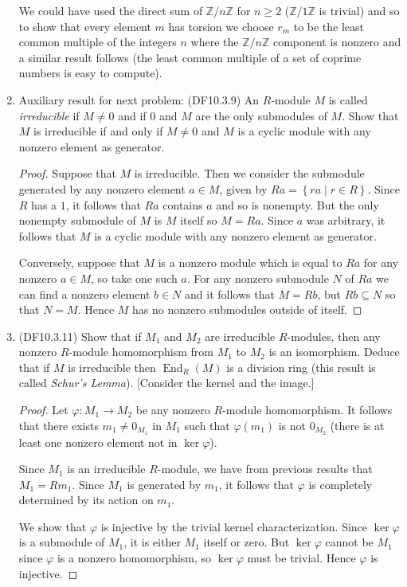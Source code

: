 \documentclass[11pt]{article}
\newcommand{\cbr}[1]{\left\{#1\right\}}
\DeclareMathOperator{\End}{End}
\begin{document}
\begin{enumerate}
    We could have used the direct sum of $\mathbb{Z}/n\mathbb{Z}$ for $n\geq 2$ ($\mathbb{Z}/1\mathbb{Z}$ is trivial) and so to show that every element $m$ has torsion we choose $r_m$ to be the least common multiple of the integers $n$ where the $\mathbb{Z}/n\mathbb{Z}$ component is nonzero and a similar result follows (the least common multiple of a set of coprime numbers is easy to compute).
    \item Auxiliary result for next problem: (DF10.3.9) An $R$-module $M$ is called \textit{irreducible} if $M\neq 0$ and if $0$ and $M$ are the only submodules of $M$. Show that $M$ is irreducible if and only if $M\neq 0$ and $M$ is a cyclic module with any nonzero element as generator. \begin{proof}
      Suppose that $M$ is irreducible. Then we consider the submodule generated by any nonzero element $a\in M$, given by $Ra = \cbr{ra\mid r\in R}$. Since $R$ has a $1$, it follows that $Ra$ contains $a$ and so is nonempty. But the only nonempty submodule of $M$ is $M$ itself so $M = Ra$. Since $a$ was arbitrary, it follows that $M$ is a cyclic module with any nonzero element as generator.

      Conversely, suppose that $M$ is a nonzero module which is equal to $Ra$ for any nonzero $a\in M$, so take one such $a$. For any nonzero submodule $N$ of $Ra$ we can find a nonzero element $b\in N$ and it follows that $M = Rb$, but $Rb\subseteq N$ so that $N = M$. Hence $M$ has no nonzero submodules outside of itself.
    \end{proof}
    \item (DF10.3.11) Show that if $M_1$ and $M_2$ are irreducible $R$-modules, then any nonzero $R$-module homomorphism from $M_1$ to $M_2$ is an isomorphism. Deduce that if $M$ is irreducible then $\End_R(M)$ is a division ring (this result is called \textit{Schur's Lemma}). [Consider the kernel and the image.] \begin{proof}
      Let $\varphi\colon M_1\to M_2$ be any nonzero $R$-module homomorphism. It follows that there exists $m_1\neq 0_{M_1}$ in $M_1$ such that $\varphi(m_1)$ is not $0_{M_2}$ (there is at least one nonzero element not in $\ker{\varphi}$).

      Since $M_1$ is an irreducible $R$-module, we have from previous results that $M_1 = Rm_1$. Since $M_1$ is generated by $m_1$, it follows that $\varphi$ is completely determined by its action on $m_1$.

      We show that $\varphi$ is injective by the trivial kernel characterization. Since $\ker\varphi$ is a submodule of $M_1$, it is either $M_1$ itself or zero. But $\ker\varphi$ cannot be $M_1$ since $\varphi$ is a nonzero homomorphism, so $\ker\varphi$ must be trivial. Hence $\varphi$ is injective.
      

\end{proof}
\end{enumerate}
\end{document}
